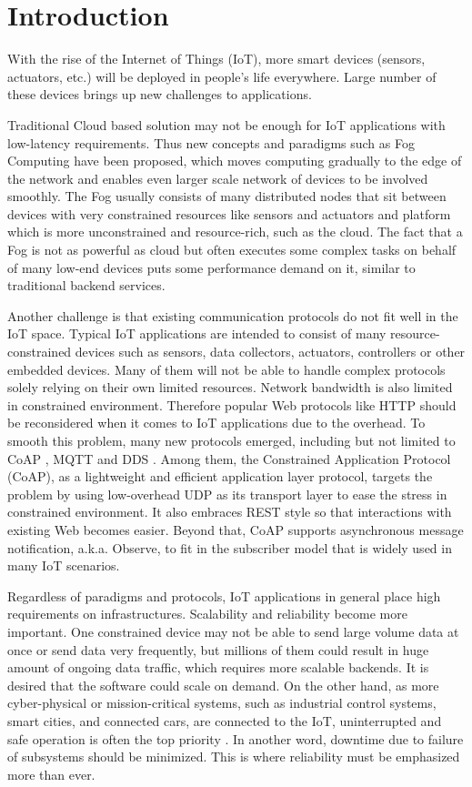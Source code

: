 \chapter{Introduction}\label{ch1}

With the rise of the Internet of Things (IoT), more smart devices (sensors, actuators, etc.) will be deployed in people's life everywhere. Large number of these devices brings up new challenges to applications. 

Traditional Cloud based solution may not be enough for IoT applications with low-latency requirements. Thus new concepts and paradigms such as Fog Computing \autocite{Bonomi:2012:FCR:2342509.2342513} have been proposed, which moves computing gradually to the edge of the network and enables even larger scale network of devices to be involved smoothly. The Fog usually consists of many distributed nodes that sit between devices with very constrained resources like sensors and actuators and platform which is more unconstrained and resource-rich, such as the cloud. The fact that a Fog is not as powerful as cloud but often executes some complex tasks on behalf of many low-end devices puts some performance demand on it, similar to traditional backend services.

Another challenge is that existing communication protocols do not fit well in the IoT space. Typical IoT applications are intended to consist of many resource-constrained devices such as sensors, data collectors, actuators, controllers or other embedded devices. Many of them will not be able to handle complex protocols solely relying on their own limited resources. Network bandwidth is also limited in constrained environment. Therefore popular Web protocols like HTTP should be reconsidered when it comes to IoT applications due to the overhead. To smooth this problem, many new protocols emerged, including but not limited to CoAP \autocite{coap_protocol}, MQTT \autocite{mqtt_protocol} and DDS \autocite{dds}. Among them, the Constrained Application Protocol (CoAP), as a lightweight and efficient application layer protocol, targets the problem by using low-overhead UDP as its transport layer to ease the stress in constrained environment. It also embraces REST style so that interactions with existing Web becomes easier. Beyond that, CoAP supports asynchronous message notification, a.k.a. Observe, to fit in the subscriber model that is widely used in many IoT scenarios. 

Regardless of paradigms and protocols, IoT applications in general place high requirements on infrastructures. Scalability and reliability become more important. One constrained device may not be able to send large volume data at once or send data very frequently, but millions of them could result in huge amount of ongoing data traffic, which requires more scalable backends. It is desired that the software could scale on demand. On the other hand, as more cyber-physical or mission-critical systems, such as industrial control systems, smart cities, and connected cars, are connected to the IoT, uninterrupted and safe operation is often the top priority \autocite{7498684}. In another word, downtime due to failure of subsystems should be minimized. This is where reliability must be emphasized more than ever. 

